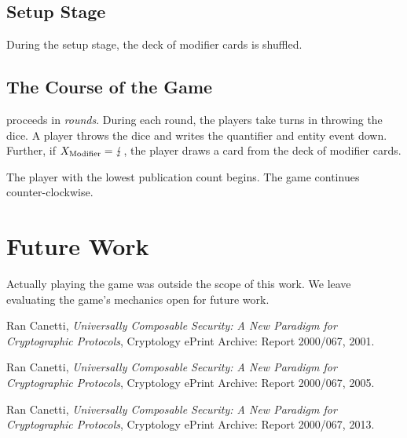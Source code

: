 \documentclass{llncs}
\begin{document}
\subsection{Setup Stage}
During the setup stage, the deck of modifier cards is shuffled.

\subsection{The Course of the Game}
\ucftw proceeds in \emph{rounds}.
During each round, the players take turns in throwing the dice.
A player throws the dice and writes the quantifier and entity event down.
Further, if $X_\text{Modifier} = \lightning$, the player draws a card from the deck of modifier cards. 

\begin{theorem}
	The player with the lowest publication count begins. The game continues counter-clockwise.
\end{theorem}

\stopsign

\section{Future Work}
Actually playing the game was outside the scope of this work.
We leave evaluating the game's mechanics open for future work.

\begin{thebibliography}{9}
  Ran Canetti,
  \emph{Universally Composable Security: A New Paradigm for Cryptographic Protocols},
  Cryptology ePrint Archive: Report 2000/067,
  2001.

  Ran Canetti,
  \emph{Universally Composable Security: A New Paradigm for Cryptographic Protocols},
  Cryptology ePrint Archive: Report 2000/067,
  2005.

  Ran Canetti,
  \emph{Universally Composable Security: A New Paradigm for Cryptographic Protocols},
  Cryptology ePrint Archive: Report 2000/067,
  2013.
\end{thebibliography}
\end{document}
